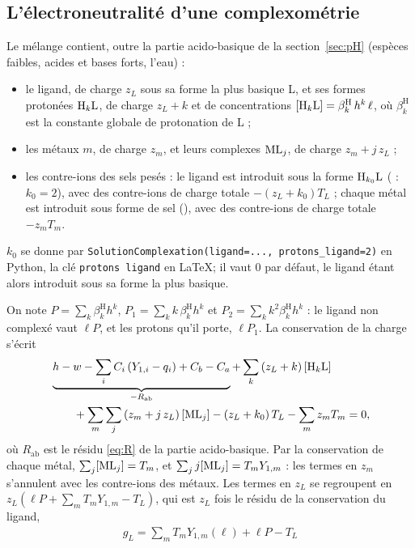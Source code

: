 \documentclass[a4paper,11pt]{article}
\newcommand\rsltm[1]{\boxed{#1}}
\newcommand\pare[1]{\left(#1\right)}
\newcommand\code[1]{\texttt{#1}}
\newcommand\bH{\beta^{\mathrm H}}
\begin{document}
\subsection{L'électroneutralité d'une complexométrie}
Le mélange contient, outre la partie acido-basique de la section~\ref{sec:pH} (espèces faibles, acides et bases forts, l'eau) :
\begin{itemize}
\item le ligand, de charge $z_L$ sous sa forme la plus basique L, et ses formes protonées $\ce{H}_k\mathrm L$, de charge $z_L+k$ et de concentrations $[\ce{H}_k\mathrm L]=\bH_k\,h^k\,\ell$, où $\bH_k$ est la constante globale de protonation de L ;
\item les métaux $m$, de charge $z_m$, et leurs complexes $\ce{ML}_j$, de charge $z_m+j\,z_L$ ;
\item les contre-ions des sels pesés : le ligand est introduit sous la forme $\ce{H}_{k_0}\mathrm L$ ( : $k_0=2$), avec des contre-ions de charge totale $-(z_L+k_0)T_L$ ; chaque métal est introduit sous forme de sel (), avec des contre-ions de charge totale $-z_mT_m$.
\end{itemize}
\begin{option}
$k_0$ se donne par \code{SolutionComplexation(ligand=..., protons\_ligand=2)} en Python, la clé \code{protons ligand} en \LaTeX ; il vaut 0 par défaut, le ligand étant alors introduit sous sa forme la plus basique.
\end{option}
On note $P=\sum_k\bH_kh^k$, $P_1=\sum_kk\,\bH_kh^k$ et $P_2=\sum_kk^2\bH_kh^k$ : le ligand non complexé vaut $\ell P$, et les protons qu'il porte, $\ell P_1$.
La conservation de la charge s'écrit
\begin{align}
\begin{split}
&\underbrace{h-w-\sum_iC_i\pare{Y_{1,i}-q_i}+C_b-C_a}_{-R_\text{ab}}
+\sum_k\pare{z_L+k}[\ce{H}_k\mathrm L]\\
&\qquad+\sum_m\sum_j\pare{z_m+j\,z_L}[\ce{ML}_j]
-\pare{z_L+k_0}T_L-\sum_mz_mT_m=0,
\end{split}
\end{align}
où $R_\text{ab}$ est le résidu \eqref{eq:R} de la partie acido-basique.
Par la conservation de chaque métal, $\sum_j[\ce{ML}_j]=T_m$, et $\sum_jj[\ce{ML}_j]=T_mY_{1,m}$ : les termes en $z_m$ s'annulent avec les contre-ions des métaux.
Les termes en $z_L$ se regroupent en $z_L\pare{\ell P+\sum_mT_mY_{1,m}-T_L}$, qui est $z_L$ fois le résidu de la conservation du ligand,
\begin{align}
\rsltm{g_L=\sum_mT_mY_{1,m}(\ell)+\ell P-T_L}
\end{align}
\end{document}

